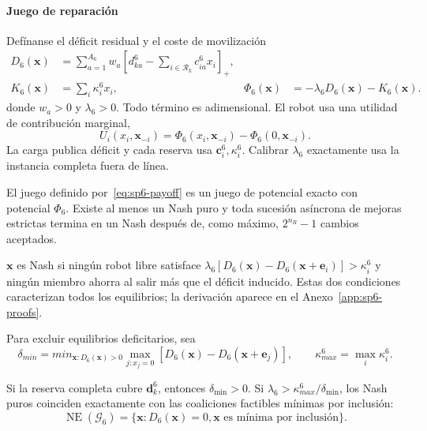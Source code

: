 \paragraph{Juego de reparación}

Defínanse el déficit residual y el coste de movilización
\begin{equation}
\label{eq:sp6-deficit-potential}
\begin{aligned}
 D_6(\boldsymbol x)
 &=\sum_{a=1}^{A_6}w_a
 \left[d_{ka}^6-\sum_{i\in\mathcal R_k}c_{ia}^6x_i\right]_+,\\
 K_6(\boldsymbol x)&=\sum_i\kappa_i^6x_i,
 &\Phi_6(\boldsymbol x)&=-\lambda_6D_6(\boldsymbol x)-K_6(\boldsymbol x).
\end{aligned}
\end{equation}
donde $w_a>0$ y $\lambda_6>0$. Todo término es adimensional. El robot usa una utilidad de contribución marginal,
\begin{equation}
\label{eq:sp6-payoff}
 U_i(x_i,\boldsymbol x_{-i})=
 \Phi_6(x_i,\boldsymbol x_{-i})-\Phi_6(0,\boldsymbol x_{-i}).
\end{equation}
La carga publica déficit y cada reserva usa $\boldsymbol c_i^6,\kappa_i^6$. Calibrar $\lambda_6$ exactamente usa la instancia completa fuera de línea.

\begin{teorema}
\label{thm:sp6-exact-potential}
El juego definido por~\eqref{eq:sp6-payoff} es un juego de potencial exacto con potencial $\Phi_6$. Existe al menos un Nash puro y toda sucesión asíncrona de mejoras estrictas termina en un Nash después de, como máximo, $2^{n_R}-1$ cambios aceptados.
\end{teorema}

$\boldsymbol x$ es Nash si ningún robot libre satisface
$\lambda_6[D_6(\boldsymbol x)-D_6(\boldsymbol x+\boldsymbol e_i)]>\kappa_i^6$
y ningún miembro ahorra al salir más que el déficit inducido. Estas dos condiciones caracterizan todos los equilibrios; la derivación aparece en el Anexo~\ref{app:sp6-proofs}.

Para excluir equilibrios deficitarios, sea
\begin{equation}
\label{eq:sp6-delta-min}
 \delta_{min}=min_{\boldsymbol x:D_6(\boldsymbol x)>0}
 \max_{j:x_j=0}\left[D_6(\boldsymbol x)-D_6(\boldsymbol x+\boldsymbol e_j)\right],
 \qquad
 \kappa_{max}^6=\max_i\kappa_i^6.
\end{equation}

\begin{teorema}
\label{thm:sp6-feasible-nash}
Si la reserva completa cubre $\boldsymbol d_k^6$, entonces $\delta_{\min}>0$. Si $\lambda_6>\kappa_{max}^6/\delta_{\min}$, los Nash puros coinciden exactamente con las coaliciones factibles mínimas por inclusión:
\[
 \operatorname{NE}(\mathcal G_6)=
 \{\boldsymbol x:D_6(\boldsymbol x)=0,
   \boldsymbol x\text{ es mínima por inclusión}\}.
\]
\end{teorema}

